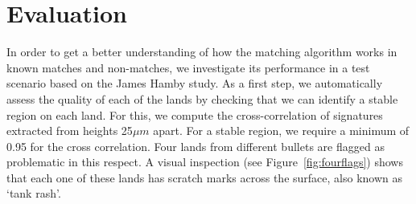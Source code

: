 \documentclass[aoas, preprint]{imsart}\usepackage[]{graphicx}\usepackage[]{color}
\begin{document}
\section{Evaluation}
In order to get a better understanding of  how  the matching algorithm works in known matches and non-matches, we investigate its performance in a test scenario based on the James Hamby study.
As a first step, we automatically assess the quality of each of the lands by  checking that we can identify a stable region on each land. For this, we compute the cross-correlation of signatures extracted from heights 25$\mu m$ apart. For a stable region, we require a minimum of 0.95 for the cross correlation. Four lands from different bullets are flagged as problematic in this respect. A visual inspection (see Figure~\ref{fig:fourflags}) shows that each one of these lands has scratch marks across the surface, also known as `tank rash'.
%
\end{document}
